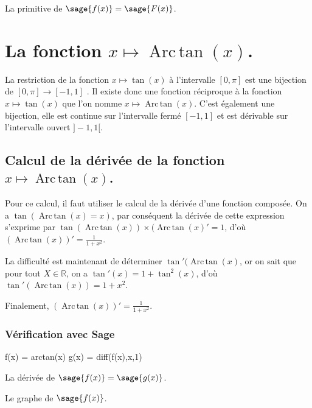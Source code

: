 \documentclass[a4paper,14pt]{extreport} %
\def\eclaire{\mathbb}
\def\R{\ensuremath{\eclaire R}}
\renewcommand{\arctan}{\mathop{\mathrm{Arc\,tan}}}
\begin{document}
La primitive de $\sage{f(x)} = \sage{F(x)} $.




\section{La fonction  $x \mapsto \arctan(x) $.}




La restriction de la fonction $x \mapsto \tan(x) $ à l'intervalle $[0,\pi]$ est une bijection de $[0,\pi] \rightarrow [-1,1]$ . Il existe donc une fonction réciproque à la fonction $x \mapsto \tan(x) $ que l'on nomme $x \mapsto \arctan(x) $. C'est également une bijection, elle est continue sur l'intervalle fermé  $ [-1,1]$ et est dérivable sur l'intervalle ouvert $]-1,1[$.



\subsection{Calcul de la dérivée de la fonction $x \mapsto \arctan(x) $.}




Pour ce calcul, il faut utiliser le calcul de la dérivée d'une fonction composée. On a $\tan(\arctan(x)=x)$, par conséquent la dérivée de cette expression s'exprime par $ \tan(\arctan(x)) \times (\arctan(x)' = 1$, d'où $(\arctan(x))' = \frac{1}{1+x^2} $.

La difficulté est maintenant de déterminer $\tan'(\arctan(x)$, or on sait que pour tout $X \in \R$, on a $ \tan'(x) =1+\tan^2(x) $, d'où $\tan'(\arctan(x)) = 1+x^2$.

Finalement, $(\arctan(x))' = \frac{1}{1+x^2}$.

\subsubsection*{Vérification avec Sage}

\begin{sageblock}
    f(x) = arctan(x)
    g(x) = diff(f(x),x,1)
\end{sageblock}

La dérivée de $\sage{f(x)} = \sage{g(x)} $.

Le graphe de $\sage{f(x)} $.


\begin{center}
 \\
\end{center}
\end{document}

